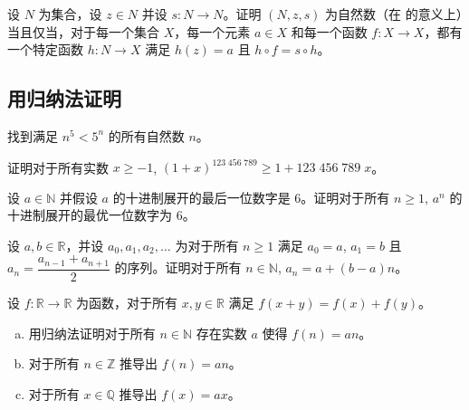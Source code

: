 \begin{chapex}
设 $N$ 为集合，设 $z \in N$ 并设 $s : N \to N$。证明 $(N, z, s)$ 为自然数（在  的意义上）当且仅当，对于每一个集合 $X$，每一个元素 $a \in X$ 和每一个函数 $f : X \to X$，都有一个特定函数 $h : N \to X$ 满足 $h(z)=a$ 且 $h \circ f = s \circ h$。
\end{chapex}

\subsection*{用归纳法证明}

\begin{chapex}
\label{cqNPowerFiveLessThanFivePowerN}
找到满足 $n^5 < 5^n$ 的所有自然数 $n$。
\end{chapex}

\begin{chapex}
证明对于所有实数 $x \ge -1$, $(1+x)^{123\;456\;789} \ge 1 + 123\;456\;789\;x$。
\end{chapex}

\begin{chapex}
设 $a \in \mathbb{N}$ 并假设 $a$ 的十进制展开的最后一位数字是 $6$。证明对于所有 $n \ge 1$, $a^n$ 的十进制展开的最优一位数字为 $6$。
\end{chapex}

\begin{chapex}
设 $a,b \in \mathbb{R}$，并设 $a_0, a_1, a_2, \dots$ 为对于所有 $n \ge 1$ 满足 $a_0 = a$, $a_1=b$ 且 $a_n = \dfrac{a_{n-1} + a_{n+1}}{2}$ 的序列。证明对于所有 $n \in \mathbb{N}$, $a_n = a + (b-a) n$。
\end{chapex}

\begin{chapex}
设 $f : \mathbb{R} \to \mathbb{R}$ 为函数，对于所有 $x,y \in \mathbb{R}$ 满足 $f(x+y) = f(x) + f(y)$。
\begin{enumerate}[(a)]
\item 用归纳法证明对于所有 $n \in \mathbb{N}$ 存在实数 $a$ 使得 $f(n) = an$。
\item 对于所有 $n \in \mathbb{Z}$ 推导出 $f(n) = an$。
\item 对于所有 $x \in \mathbb{Q}$ 推导出 $f(x) = ax$。
\end{enumerate}
\end{chapex}

